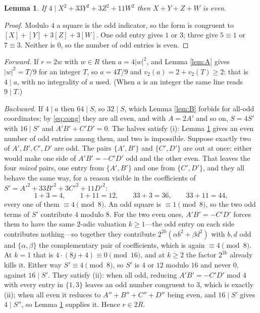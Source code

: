 \documentclass[11pt,reqno]{amsart}
\theoremstyle{plain}
\newtheorem{lemma}[theorem]{Lemma}
\theoremstyle{definition}
\newcommand{\Lat}{R}
\begin{document}
\begin{lemma}\label{lem:C}
If $4 \mid X^2 + 33Y^2 + 3Z^2 + 11W^2$ then $X+Y+Z+W$ is even.
\end{lemma}

\begin{proof}
Modulo $4$ a square is the odd indicator, so the form is congruent to
$[X] + [Y] + 3[Z] + 3[W]$. One odd entry gives $1$ or $3$; three give
$5 \equiv 1$ or $7 \equiv 3$. Neither is $0$, so the number of odd entries is
even.
\end{proof}

\emph{Forward.} If $r = 2w$ with $w \in \Lat$ then $a = 4\lvert w \rvert^2$, and
Lemma \ref{lem:A} gives $\lvert w \rvert^2 = T/9$ for an integer $T$, so
$a = 4T/9$ and $v_2(a) = 2 + v_2(T) \ge 2$: that is $4 \mid a$, with no
integrality of $a$ used. (When $a$ is an integer the same line reads
$9 \mid T$.)

\emph{Backward.} If $4 \mid a$ then $64 \mid S$, so $32 \mid S$, which Lemma
\ref{lem:B} forbids for all-odd coordinates; by \eqref{eq:cong} they are all even,
and with $A = 2A'$ and so on, $S = 4S'$ with $16 \mid S'$ and $A'B' + C'D' = 0$.
The halves satisfy (i): Lemma \ref{lem:C} gives an even number of odd entries
among them, and two is impossible. Suppose exactly two of $A',B',C',D'$ are odd.
The pairs $\{A',B'\}$ and $\{C',D'\}$ are out at once: either would make one side
of $A'B' = -C'D'$ odd and the other even. That leaves the four \emph{mixed}
pairs, one entry from $\{A',B'\}$ and one from $\{C',D'\}$, and they all behave
the same way, for a reason visible in the coefficients of
$S' = A'^2 + 33B'^2 + 3C'^2 + 11D'^2$:
\[
  1 + 3 = 4, \qquad 1 + 11 = 12, \qquad 33 + 3 = 36, \qquad 33 + 11 = 44,
\]
every one of them $\equiv 4 \pmod 8$. An odd square is $\equiv 1 \pmod 8$, so the
two odd terms of $S'$ contribute $4$ modulo $8$. For the two even ones,
$A'B' = -C'D'$ forces them to have the same $2$-adic valuation $k \ge 1$---the odd
entry on each side contributes nothing---so together they contribute
$2^{2k}(\alpha b^2 + \beta d^2)$ with $b,d$ odd and $\{\alpha,\beta\}$ the
complementary pair of coefficients, which is again $\equiv 4 \pmod 8$. At $k = 1$
that is $4 \cdot (8j+4) \equiv 0 \pmod{16}$, and at $k \ge 2$ the factor
$2^{2k}$ already kills it. Either way $S' \equiv 4 \pmod 8$, so $S'$ is $4$ or
$12$ modulo $16$ and never $0$, against $16 \mid S'$.
They satisfy (ii): when all odd, reducing $A'B' = -C'D'$ mod $4$ with every entry
in $\{1,3\}$ leaves an odd number congruent to $3$, which is exactly (ii); when
all even it reduces to $A''+B''+C''+D''$ being even, and $16 \mid S'$ gives
$4 \mid S''$, so Lemma \ref{lem:C} supplies it. Hence $r \in 2\Lat$.
\hfill\qedsymbol
\end{document}
